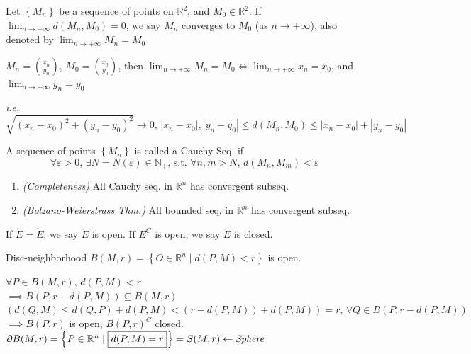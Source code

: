\begin{definition}
    Let $\left\{M_n\right\}$ be a sequence of points on $\mathbb{R}^2$, and $M_0\in\mathbb{R}^2$. If $\lim_{n\to+\infty}d\left(M_n,M_0\right)=0$, we say $M_n$ converges to $M_0$ (as $n\to+\infty$), also denoted by $\lim_{n\to+\infty}M_n=M_0$
\end{definition}

$M_n=\binom{x_n}{y_n},\,M_0=\binom{x_0}{y_0}$, then $\lim_{n\to+\infty}M_n=M_0\iff\lim_{n\to+\infty}x_n=x_0$, and $\lim_{n\to+\infty}y_n=y_0$

\emph{i.e. $\sqrt{\left(x_n-x_0\right)^2+\left(y_n-y_0\right)^2}\to 0,\,\left|x_n-x_0\right|,\left|y_n-y_0\right|\leq d\left(M_n,M_0\right)\leq\left|x_n-x_0\right|+\left|y_n-y_0\right|$}

\begin{mdframed}
    A sequence of points $\left\{M_n\right\}$ is called a Cauchy Seq. if
    $$\forall\varepsilon>0,\,\exists N=N(\varepsilon)\in\mathbb{N}_+\text{, s.t. }\forall n,m>N,\,d\left(M_n,M_m\right)<\varepsilon$$
    \begin{theorem}
        \begin{enumerate}
            \item \emph{(Completeness)} All Cauchy seq. in $\mathbb{R}^n$ has convergent subseq.
            \item \emph{(Bolzano-Weierstrass Thm.)} All bounded seq. in $\mathbb{R}^n$ has convergent subseq.
        \end{enumerate}
    \end{theorem}
\end{mdframed}

\begin{definition}
    If $E=\mathring{E}$, we say $E$ is open. If $E^C$ is open, we say $E$ is closed.
\end{definition}

\begin{example}
    Disc-neighborhood $B(M,r)=\left\{O\in\mathbb{R}^n\mid d(P,M)<r\right\}$ is open.
\end{example}

$\forall P\in B(M,r),\,d(P,M)<r$\\
$\implies B\left(P,r-d(P,M)\right)\subseteq B(M,r)$\\
$\left(d(Q,M)\leq d(Q,P)+d(P,M)<\left(r-d(P,M)\right)+d(P,M)\right)=r,\,\forall Q\in B\left(P,r-d(P,M)\right)$\\
$\implies B(P,r)$ is open, $B(P,r)^C$ closed.\\
$\partial B(M,r)=\left\{P\in\mathbb{R}^n\mid\boxed{d(P,M)=r}\right\}=S(M,r)\leftarrow\text{\emph{Sphere}}$

